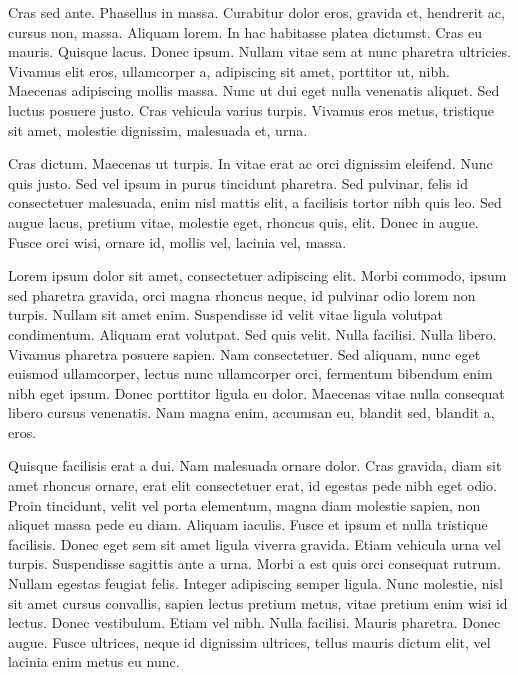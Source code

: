 Cras sed ante. Phasellus in massa. Curabitur dolor eros, gravida et, hendrerit
ac, cursus non, massa. Aliquam lorem. In hac habitasse platea dictumst. Cras eu
mauris. Quisque lacus. Donec ipsum. Nullam vitae sem at nunc pharetra
ultricies. Vivamus elit eros, ullamcorper a, adipiscing sit amet, porttitor ut,
nibh. Maecenas adipiscing mollis massa. Nunc ut dui eget nulla venenatis
aliquet. Sed luctus posuere justo. Cras vehicula varius turpis. Vivamus eros
metus, tristique sit amet, molestie dignissim, malesuada et, urna.

Cras dictum. Maecenas ut turpis. In vitae erat ac orci dignissim eleifend. Nunc
quis justo. Sed vel ipsum in purus tincidunt pharetra. Sed pulvinar, felis id
consectetuer malesuada, enim nisl mattis elit, a facilisis tortor nibh quis
leo. Sed augue lacus, pretium vitae, molestie eget, rhoncus quis, elit. Donec
in augue. Fusce orci wisi, ornare id, mollis vel, lacinia vel, massa.

Lorem ipsum dolor sit amet, consectetuer adipiscing elit. Morbi commodo, ipsum
sed pharetra gravida, orci magna rhoncus neque, id pulvinar odio lorem non
turpis. Nullam sit amet enim. Suspendisse id velit vitae ligula volutpat
condimentum. Aliquam erat volutpat. Sed quis velit. Nulla facilisi. Nulla
libero. Vivamus pharetra posuere sapien. Nam consectetuer. Sed aliquam, nunc
eget euismod ullamcorper, lectus nunc ullamcorper orci, fermentum bibendum enim
nibh eget ipsum. Donec porttitor ligula eu dolor. Maecenas vitae nulla
consequat libero cursus venenatis. Nam magna enim, accumsan eu, blandit sed,
blandit a, eros.

Quisque facilisis erat a dui. Nam malesuada ornare dolor. Cras gravida, diam
sit amet rhoncus ornare, erat elit consectetuer erat, id egestas pede nibh eget
odio. Proin tincidunt, velit vel porta elementum, magna diam molestie sapien,
non aliquet massa pede eu diam. Aliquam iaculis. Fusce et ipsum et nulla
tristique facilisis. Donec eget sem sit amet ligula viverra gravida. Etiam
vehicula urna vel turpis. Suspendisse sagittis ante a urna. Morbi a est quis
orci consequat rutrum. Nullam egestas feugiat felis. Integer adipiscing semper
ligula. Nunc molestie, nisl sit amet cursus convallis, sapien lectus pretium
metus, vitae pretium enim wisi id lectus. Donec vestibulum. Etiam vel nibh.
Nulla facilisi. Mauris pharetra. Donec augue. Fusce ultrices, neque id
dignissim ultrices, tellus mauris dictum elit, vel lacinia enim metus eu nunc.

